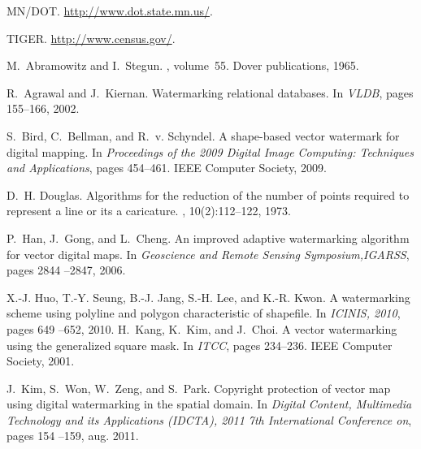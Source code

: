 \documentclass{sig-alternate}%
\begin{document}
%
%
\begin{thebibliography}{10}

{MN}/{DOT}.
\newblock \url{http://www.dot.state.mn.us/}.

{TIGER}.
\newblock \url{http://www.census.gov/}.

M.~Abramowitz and I.~Stegun.
, volume~55.
\newblock Dover publications, 1965.

R.~Agrawal and J.~Kiernan.
\newblock Watermarking relational databases.
\newblock In {\em VLDB}, pages 155--166, 2002.

S.~Bird, C.~Bellman, and R.~v. Schyndel.
\newblock A shape-based vector watermark for digital mapping.
\newblock In {\em Proceedings of the 2009 Digital Image Computing: Techniques
  and Applications}, pages 454--461. IEEE Computer Society, 2009.

D.~H. Douglas.
\newblock Algorithms for the reduction of the number of points required to
  represent a line or its a caricature.
, 10(2):112--122, 1973.

P.~Han, J.~Gong, and L.~Cheng.
\newblock An improved adaptive watermarking algorithm for vector digital maps.
\newblock In {\em Geoscience and Remote Sensing Symposium,IGARSS}, pages 2844
  --2847, 2006.

X.-J. Huo, T.-Y. Seung, B.-J. Jang, S.-H. Lee, and K.-R. Kwon.
\newblock A watermarking scheme using polyline and polygon characteristic of
  shapefile.
\newblock In {\em ICINIS, 2010}, pages 649 --652, 2010.
\vfill\eject
{}
H.~Kang, K.~Kim, and J.~Choi.
\newblock A vector watermarking using the generalized square mask.
\newblock In {\em ITCC}, pages 234--236. IEEE Computer Society, 2001.

J.~Kim, S.~Won, W.~Zeng, and S.~Park.
\newblock Copyright protection of vector map using digital watermarking in the
  spatial domain.
\newblock In {\em Digital Content, Multimedia Technology and its Applications
  (IDCTA), 2011 7th International Conference on}, pages 154 --159, aug. 2011.


\end{thebibliography}
\end{document}
